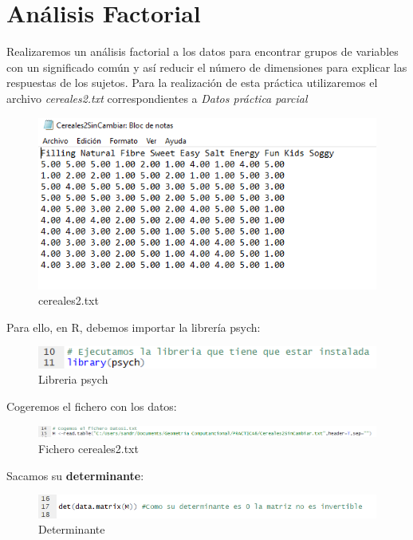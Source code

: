 \documentclass[12pt,a4paper]{book}
\begin{document}
\chapter{Análisis Factorial}
\label{sec:af} %
Realizaremos un análisis factorial a los datos para encontrar grupos de variables con un significado común y así reducir el número de dimensiones para explicar las respuestas de los sujetos. 
Para la realización de esta práctica utilizaremos el archivo\textit{ cereales2.txt} correspondientes a \textit{Datos práctica parcial}
\begin{figure}[H]
\centering
\includegraphics[scale=1]{Captura0.png} 
\caption{cereales2.txt}
\label{fig:c2txt}
\end{figure}
Para ello, en R, debemos importar la librería psych: 
\begin{figure}[H]
\centering
\includegraphics[scale=1]{Captura1.png} 
\caption{Libreria psych}
\label{fig:LibP}
\end{figure}
Cogeremos el fichero con los datos: 
\begin{figure}[H]
\centering
\includegraphics[scale=0.6]{Captura2.png} 
\caption{Fichero cereales2.txt}
\label{fig:c2}
\end{figure}
Sacamos su \textbf{determinante}: 
\begin{figure}[H]
\centering
\includegraphics[scale=0.8]{Captura3.png} 
\caption{Determinante}
\label{fig:Det}
\end{figure}
\end{document}
